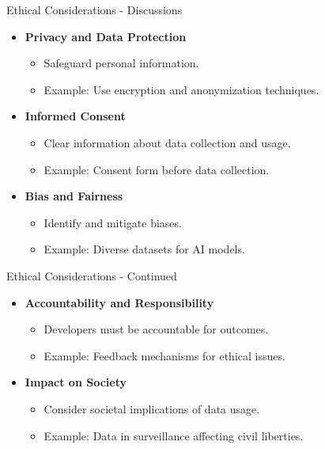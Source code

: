 \documentclass[aspectratio=169]{beamer}
\begin{document}
\begin{frame}[fragile]{Ethical Considerations - Discussions}
  \begin{itemize}
    \item \textbf{Privacy and Data Protection}
      \begin{itemize}
        \item Safeguard personal information.
        \item Example: Use encryption and anonymization techniques.
      \end{itemize}
      
    \item \textbf{Informed Consent}
      \begin{itemize}
        \item Clear information about data collection and usage.
        \item Example: Consent form before data collection.
      \end{itemize}
      
    \item \textbf{Bias and Fairness}
      \begin{itemize}
        \item Identify and mitigate biases.
        \item Example: Diverse datasets for AI models.
      \end{itemize}
  \end{itemize}
\end{frame}

\begin{frame}[fragile]{Ethical Considerations - Continued}
  \begin{itemize}
    \item \textbf{Accountability and Responsibility}
      \begin{itemize}
        \item Developers must be accountable for outcomes.
        \item Example: Feedback mechanisms for ethical issues.
      \end{itemize}
      
    \item \textbf{Impact on Society}
      \begin{itemize}
        \item Consider societal implications of data usage.
        \item Example: Data in surveillance affecting civil liberties.
      \end{itemize}
  \end{itemize}
\end{frame}
\end{document}
